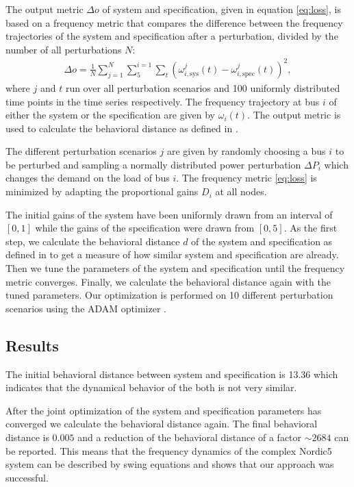 \documentclass[conference]{IEEEtran}
\begin{document}
The output metric $\Delta o$ of system and specification, given in equation \eqref{eq:loss}, is based on a frequency metric that compares the difference between the frequency trajectories of the system and specification after a perturbation, divided by the number of all perturbations $N$:
\begin{align}
    \Delta o = \frac{1}{N} \sum_{j=1}^{N} \sum_{5}^{i=1} \sum_{t} \left(\omega_{i, \mathrm{sys}}^j(t) - \omega_{i, \mathrm{spec}}^j(t)\right)^2, \label{eq:loss}
\end{align}
where $j$ and $t$ run over all perturbation scenarios and 100 uniformly distributed time points in the time series respectively. The frequency trajectory at bus $i$ of either the system or the specification are given by $\omega_i(t)$. The output metric is used to calculate the behavioral distance as defined in \cite{hellmann2021probetune}.

The different perturbation scenarios $j$ are given by randomly choosing a bus $i$ to be perturbed and sampling a normally distributed power perturbation $\Delta P_i$ which changes the demand on the load of bus $i$. The frequency metric \eqref{eq:loss} is minimized by adapting the proportional gains $D_i$ at all nodes. 

The initial gains of the system have been uniformly drawn from an interval of $[0, 1]$ while the gains of the specification were drawn from $[0, 5]$.
As the first step, we calculate the behavioral distance $d$ of the system and specification as defined in \cite{hellmann2021probetune} to get a measure of how similar system and specification are already. Then we tune the parameters of the system and specification until the frequency metric converges. Finally, we calculate the behavioral distance again with the tuned parameters.
Our optimization is performed on 10 different perturbation scenarios using the ADAM optimizer \cite{kingma2014adam}.

\subsection{Results}
The initial behavioral distance between system and specification is 13.36 which indicates that the dynamical behavior of the both is not very similar. 

After the joint optimization of the system and specification parameters has converged we calculate the behavioral distance again. The final behavioral distance is $0.005$ and a reduction of the behavioral distance of a factor $\sim 2684$ can be reported. This means that the frequency dynamics of the complex Nordic5 system can be described by swing equations and shows that our approach was successful.
\end{document}

